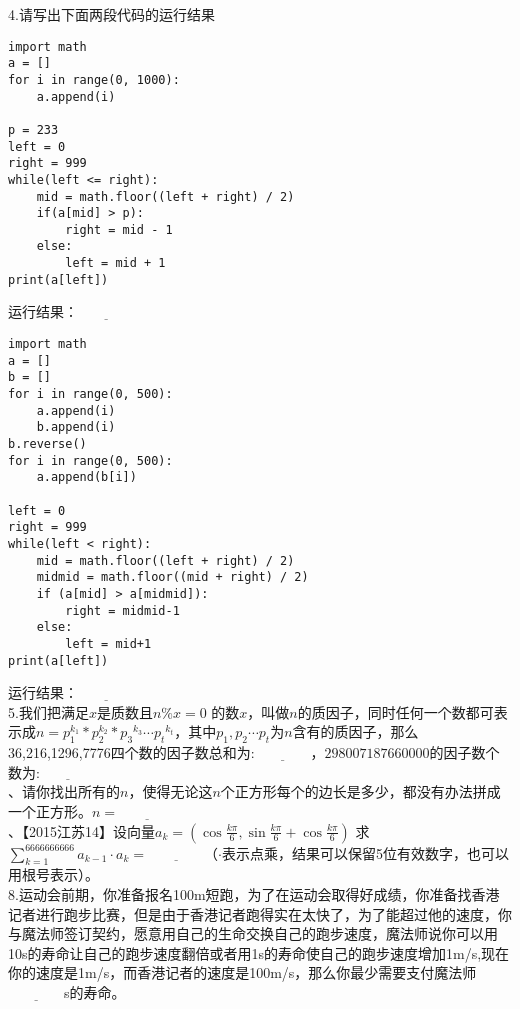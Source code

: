 \noindent 4.请写出下面两段代码的运行结果
\begin{lstlisting}
import math
a = []
for i in range(0, 1000):
    a.append(i)

p = 233
left = 0
right = 999
while(left <= right):
    mid = math.floor((left + right) / 2)
    if(a[mid] > p):
        right = mid - 1
    else:
        left = mid + 1
print(a[left])
\end{lstlisting}
运行结果：$\underline{\qquad \qquad }$

\begin{lstlisting}
import math
a = []
b = []
for i in range(0, 500):
    a.append(i)
    b.append(i)
b.reverse()
for i in range(0, 500):
    a.append(b[i])

left = 0
right = 999
while(left < right):
    mid = math.floor((left + right) / 2)
    midmid = math.floor((mid + right) / 2)
    if (a[mid] > a[midmid]):
        right = midmid-1
    else:
        left = mid+1
print(a[left])
\end{lstlisting}
运行结果：$\underline{\qquad \qquad }$ \\

\noindent 5.我们把满足$x$是质数且$n\%x=0$ 的数$x$，叫做$n$的质因子，同时任何一个数都可表示成$n = p_{1}^{k_{1}}*p_{2}^{k_2}*{p_3}^{k_3}\cdots {p_t}^{k_t}$，其中$p_1,p_2\cdots p_t$为$n$含有的质因子，那么36,216,1296,7776四个数的因子数总和为:$\underline{\qquad \qquad }$，$298007187660000$的因子数个数为:$\underline{\qquad \qquad }$ \\

、请你找出所有的$n$，使得无论这$n$个正方形每个的边长是多少，都没有办法拼成一个正方形。$n=\underline{\qquad \qquad }$\\

、【2015江苏14】设向量$a_{k}=(\cos\frac{k\pi}{6},\sin \frac{k\pi}{6}+\cos \frac{k\pi}{6})$ 求$\sum_{k=1}^{6666666666}a_{k-1}\cdot a_{k} = \underline{\qquad \qquad}$（$\cdot$表示点乘，结果可以保留5位有效数字，也可以用根号表示）。 \\

\noindent 8.运动会前期，你准备报名100m短跑，为了在运动会取得好成绩，你准备找香港记者进行跑步比赛，但是由于香港记者跑得实在太快了，为了能超过他的速度，你与魔法师签订契约，愿意用自己的生命交换自己的跑步速度，魔法师说你可以用10s的寿命让自己的跑步速度翻倍或者用1s的寿命使自己的跑步速度增加1m/s,现在你的速度是1m/s，而香港记者的速度是100m/s，那么你最少需要支付魔法师$\underline{\qquad \qquad }$s的寿命。 \\

